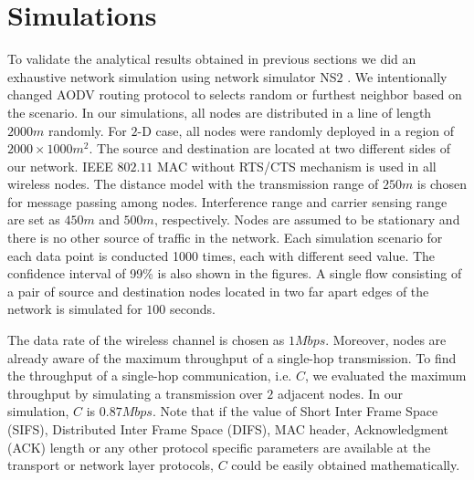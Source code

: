 \documentclass[12pt, draftclsnofoot, onecolumn]{IEEEtran}
\begin{document}
\section{Simulations}
\label{simulation}
To validate the analytical results obtained in previous sections 
we did an exhaustive network simulation using network simulator 
NS$2$ \cite{ns}. We intentionally changed AODV routing protocol 
to selects random or furthest neighbor based on the scenario. 
In our simulations, all nodes are distributed in a 
line of length $2000m$ randomly. For $2$-D case, all nodes 
were randomly deployed in a region of $2000 \times 1000 m^2$. 
The source and destination are 
located at two different sides of our network. IEEE $802.11$ MAC 
without RTS/CTS mechanism is used in all wireless nodes. The 
distance model with the transmission range of $250m$ is chosen for 
message passing among nodes. 
Interference range and carrier 
sensing range are set as $450m$ and $500m$, respectively.
Nodes are assumed to be stationary and there is 
no other source of traffic in the network. 
Each simulation scenario for each data point is conducted 1000 times, each with different seed value. The confidence interval of 99\%  is also shown in the figures. A single flow consisting of a pair of source and destination nodes located in two far apart edges of the network is simulated for $100$ seconds.

The data rate of the wireless channel is chosen as $1Mbps$. Moreover, nodes are already aware of the maximum throughput 
of a single-hop transmission. 
To find the throughput of a single-hop communication, i.e. $C$, we evaluated the maximum 
throughput by simulating a transmission over $2$ adjacent 
nodes. In our simulation, $C$ is $0.87Mbps$. 
Note that if the value of Short Inter Frame Space (SIFS), Distributed Inter Frame Space (DIFS), MAC header, Acknowledgment (ACK) length or any other protocol specific parameters are available at the transport or network layer protocols, $C$ could be easily obtained mathematically.
 
\end{document}
